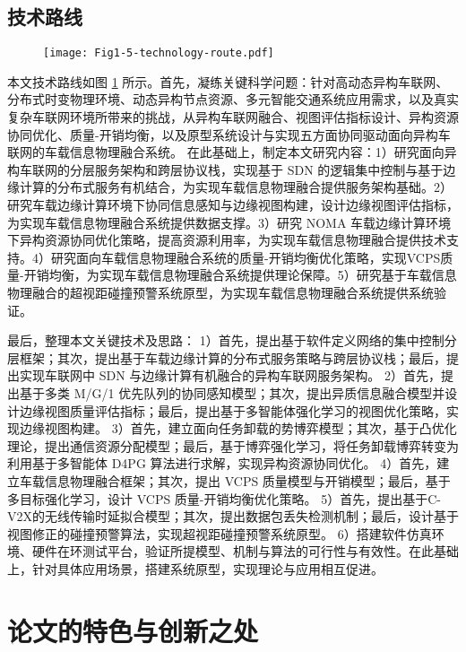 \subsection{技术路线}

\begin{figure}[h]
\centering
	\texttt{[image: Fig1-5-technology-route.pdf]}
	\label{fig 1-5}
\end{figure}

本文技术路线如图 \ref{fig 1-5} 所示。首先，凝练关键科学问题：针对高动态异构车联网、分布式时变物理环境、动态异构节点资源、多元智能交通系统应用需求，以及真实复杂车联网环境所带来的挑战，从异构车联网融合、视图评估指标设计、异构资源协同优化、质量-开销均衡，以及原型系统设计与实现五方面协同驱动面向异构车联网的车载信息物理融合系统。
在此基础上，制定本文研究内容：1）研究面向异构车联网的分层服务架构和跨层协议栈，实现基于 SDN 的逻辑集中控制与基于边缘计算的分布式服务有机结合，为实现车载信息物理融合提供服务架构基础。2）研究车载边缘计算环境下协同信息感知与边缘视图构建，设计边缘视图评估指标，为实现车载信息物理融合系统提供数据支撑。3）研究 NOMA 车载边缘计算环境下异构资源协同优化策略，提高资源利用率，为实现车载信息物理融合提供技术支持。4）研究面向车载信息物理融合系统的质量-开销均衡优化策略，实现VCPS质量-开销均衡，为实现车载信息物理融合系统提供理论保障。5）研究基于车载信息物理融合的超视距碰撞预警系统原型，为实现车载信息物理融合系统提供系统验证。

最后，整理本文关键技术及思路：
1）首先，提出基于软件定义网络的集中控制分层框架；其次，提出基于车载边缘计算的分布式服务策略与跨层协议栈；最后，提出实现车联网中 SDN 与边缘计算有机融合的异构车联网服务架构。
2）首先，提出基于多类 M/G/1 优先队列的协同感知模型；其次，提出异质信息融合模型并设计边缘视图质量评估指标；最后，提出基于多智能体强化学习的视图优化策略，实现边缘视图构建。
3）首先，建立面向任务卸载的势博弈模型；其次，基于凸优化理论，提出通信资源分配模型；最后，基于博弈强化学习，将任务卸载博弈转变为利用基于多智能体 D4PG 算法进行求解，实现异构资源协同优化。
4）首先，建立车载信息物理融合框架；其次，提出 VCPS 质量模型与开销模型；最后，基于多目标强化学习，设计 VCPS 质量-开销均衡优化策略。
5）首先，提出基于C-V2X的无线传输时延拟合模型；其次，提出数据包丢失检测机制；最后，设计基于视图修正的碰撞预警算法，实现超视距碰撞预警系统原型。
6）搭建软件仿真环境、硬件在环测试平台，验证所提模型、机制与算法的可行性与有效性。在此基础上，针对具体应用场景，搭建系统原型，实现理论与应用相互促进。

\section{论文的特色与创新之处}\label{section 1-6}

